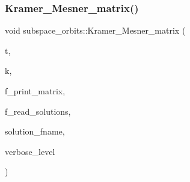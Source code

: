 \mbox{\label{classsubspace__orbits_ac1870a5a3ac41a256517c9d03b5ab6bc}} 
\subsubsection{\texorpdfstring{Kramer\+\_\+\+Mesner\+\_\+matrix()}{Kramer\_Mesner\_matrix()}}
{\footnotesize\ttfamily void subspace\+\_\+orbits\+::\+Kramer\+\_\+\+Mesner\+\_\+matrix (\begin{DoxyParamCaption}\item[{\mbox{\hyperlink{galois_8h_a09fddde158a3a20bd2dcadb609de11dc}{I\+NT}}}]{t,  }\item[{\mbox{\hyperlink{galois_8h_a09fddde158a3a20bd2dcadb609de11dc}{I\+NT}}}]{k,  }\item[{\mbox{\hyperlink{galois_8h_a09fddde158a3a20bd2dcadb609de11dc}{I\+NT}}}]{f\+\_\+print\+\_\+matrix,  }\item[{\mbox{\hyperlink{galois_8h_a09fddde158a3a20bd2dcadb609de11dc}{I\+NT}}}]{f\+\_\+read\+\_\+solutions,  }\item[{const \mbox{\hyperlink{galois_8h_ab6cc7b4aeb6ea31aba2b3fbfc83ff5e6}{B\+Y\+TE}} $\ast$}]{solution\+\_\+fname,  }\item[{\mbox{\hyperlink{galois_8h_a09fddde158a3a20bd2dcadb609de11dc}{I\+NT}}}]{verbose\+\_\+level }\end{DoxyParamCaption})}

\mbox{\label{classsubspace__orbits_ab3b725a940c2efd222746887c266d9de}} 
